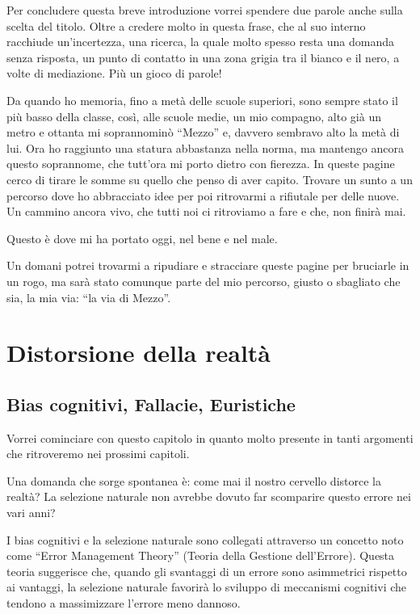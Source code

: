 \documentclass[12pt]{book} %
\begin{document}
Per concludere questa breve introduzione vorrei spendere due parole anche sulla scelta del titolo. Oltre a credere molto
in questa frase, che al suo interno racchiude un'incertezza, una ricerca, la quale molto spesso
resta una domanda senza risposta, un punto di contatto in una zona grigia tra il bianco e il nero, a volte di
mediazione. Più un gioco di parole!

Da quando ho memoria, fino a metà delle scuole superiori, sono sempre stato il più basso della classe, così, alle scuole
medie, un mio compagno, alto già un metro e ottanta mi soprannominò “Mezzo” e, davvero sembravo alto la metà di lui.
Ora ho raggiunto una statura abbastanza nella norma, ma mantengo ancora questo soprannome, che
tutt'ora mi porto dietro con fierezza. In queste pagine cerco di tirare le somme su quello che
penso di aver capito. Trovare un sunto a un percorso dove ho abbracciato idee per poi ritrovarmi a rifiutale per delle
nuove. Un cammino ancora vivo, che tutti noi ci ritroviamo a fare e che, non finirà mai. 

Questo è dove mi ha portato oggi, nel bene e nel male.

Un domani potrei trovarmi a ripudiare e stracciare queste pagine per bruciarle in un rogo, ma sarà stato comunque parte
del mio percorso, giusto o sbagliato che sia, la mia via: “la via di Mezzo”.

\clearpage\section{Distorsione della realtà}
\subsection{Bias cognitivi, Fallacie, Euristiche}
Vorrei cominciare con questo capitolo in quanto molto presente in tanti argomenti che ritroveremo nei prossimi capitoli.


Una domanda che sorge spontanea è: come mai il nostro cervello distorce la realtà? La selezione naturale non avrebbe
dovuto far scomparire questo errore nei vari anni?

I bias cognitivi e la selezione naturale sono collegati attraverso un concetto noto come “Error Management Theory”
(Teoria della Gestione dell'Errore). Questa teoria suggerisce che, quando gli svantaggi di un
errore sono asimmetrici rispetto ai vantaggi, la selezione naturale favorirà lo sviluppo di meccanismi cognitivi che
tendono a massimizzare l'errore meno dannoso.
\end{document}
